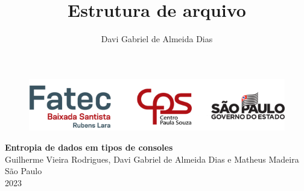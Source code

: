 \documentclass[12pt, a4paper, brazil]{article}
\author{Davi Gabriel de Almeida Dias}
\title{Estrutura de arquivo}
\begin{document}
	\begin{center}
	\begin{figure}[!htpb]
		\centering
		\includegraphics[width=170mm]{logo}
    \vspace{8cm}
	\end{figure}
		{\LARGE \textbf{Entropia de dados em tipos de consoles} \\[3mm]}
		{\large Guilherme Vieira Rodrigues, Davi Gabriel de Almeida Dias e Matheus Madeira}
    \vspace{9cm}
       \\São Paulo\\2023
	\end{center}
	\newpage
    
\end{document}
